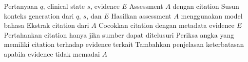 \begin{algorithm}[!htbp]
    \caption{Grounded Generation dan Citation Resolution}
    \label{alg:alg5.4_grounded_generation_dan_citation}
    \begin{algorithmic}[1]
        \Require Pertanyaan $q$, clinical state $s$, evidence $E$
        \Ensure Assessment $A$ dengan citation
        \State Susun konteks generation dari $q$, $s$, dan $E$
        \State Hasilkan assessment $A$ menggunakan model bahasa
        \State Ekstrak citation dari $A$
            \State Cocokkan citation dengan metadata evidence $E$
            \State Pertahankan citation hanya jika sumber dapat ditelusuri
        \EndFor
        \State Periksa angka yang memiliki citation terhadap evidence terkait
        \State Tambahkan penjelasan keterbatasan apabila evidence tidak memadai
        \State \Return $A$
    \end{algorithmic}
\end{algorithm}
